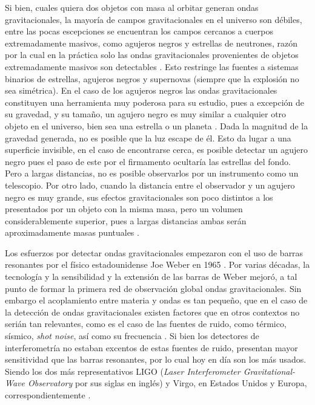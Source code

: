 	Si bien, cuales quiera dos objetos con masa al orbitar generan ondas gravitacionales, la mayor\'ia de campos gravitacionales en el universo son d\'ebiles, entre las pocas escepciones se encuentran los campos cercanos a cuerpos extremadamente masivos, como agujeros negros y estrellas de neutrones, raz\'on por la cual	en la pr\'actica solo las ondas gravitacionales provenientes de objetos extremadamente masivos son detectables \cite{straumann2012general}. Esto restringe las fuentes a sistemas binarios de estrellas, agujeros negros y supernovas (siempre que la explosi\'on no sea sim\'etrica). En el caso de los agujeros negros las ondas gravitacionales constituyen una herramienta muy poderosa para su estudio, pues a excepción de su gravedad, y su tamaño, un agujero negro es muy similar a cualquier otro objeto en el universo, bien sea una estrella o un planeta \cite{meier2012black}. Dada la magnitud de la gravedad generada, no es posible que la luz escape de él. Esto da lugar a una superficie invisible, en el caso de encontrarse cerca, es posible detectar un agujero negro pues el paso de este por el firmamento ocultar\'ia las estrellas del fondo. Pero a largas distancias, no es posible observarlos por un instrumento como un telescopio. Por otro lado, cuando la distancia entre el observador y un agujero negro es muy grande, sus efectos gravitacionales son poco distintos a los presentados por un objeto con la misma masa, pero un volumen considerablemente superior, pues a largas distancias ambas serán aproximadamente masas puntuales \cite{meier2012black}.
	
	Los esfuerzos por detectar ondas gravitacionales empezaron con el uso de barras resonantes por el f\'isico estadounidense Joe Weber en 1965 \cite{weber1967gravitational, bassan2014advanced}. Por varias d\'ecadas, la tecnolog\'ia y la sensibilidad y la extensi\'on de las barras de Weber mejor\'o, a tal punto de formar la primera red de observaci\'on global ondas gravitacionales. Sin embargo el acoplamiento entre materia y ondas es tan peque\~no, que en el caso de la detecci\'on de ondas gravitacionales existen factores que en otros contextos no seri\'an tan relevantes, como es el caso de las fuentes de ruido, como t\'ermico, s\'ismico, \textit{shot noise}, as\'i como su frecuencia \cite{bassan2014advanced}. Si bien los detectores de interferometr\'ia no estaban excentos de estas fuentes de ruido, presentan mayor sensitividad que las barras resonantes, por lo cual hoy en d\'ia son los m\'as usados. Siendo los dos m\'as representativos LIGO (\textit{Laser Interferometer Gravitational-Wave Observatory} por sus siglas en ingl\'es) y Virgo, en Estados Unidos y Europa, correspondientemente \cite{abbott2009ligo, acernese2008status, bassan2014advanced}.
	
